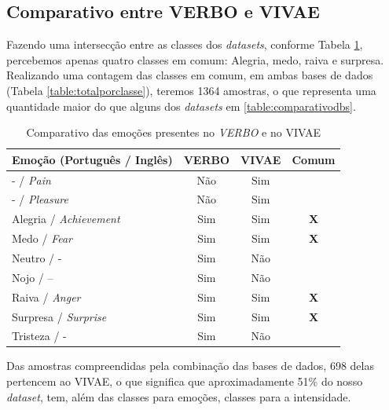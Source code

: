 \subsection{Comparativo entre VERBO e VIVAE}

Fazendo uma intersecção entre as classes dos \textit{datasets}, conforme Tabela \ref{table:verbovsvivae}, percebemos apenas quatro classes em comum: Alegria, medo, raiva e surpresa. Realizando uma contagem das classes em comum, em ambas bases de dados (Tabela \ref{table:totalporclasse}), teremos 1364 amostras, o que representa uma quantidade maior do que alguns dos \textit{datasets} em \ref{table:comparativodbs}.

\begin{table}[]
\centering
\caption{Comparativo das emoções presentes no \textit{VERBO} e no \acrshort{VIVAE}}
    \begin{tabular}{|l|c|c|c|}
    \hline
        Emoção (Português / Inglês) & VERBO & VIVAE & Comum  \\ \hline
        - / \textit{Pain} & Não & Sim &    \\ \hline
        - / \textit{Pleasure} & Não & Sim &    \\ \hline
        Alegria / \textit{Achievement} & Sim & Sim & \textbf{X}  \\ \hline
        Medo / \textit{Fear} & Sim & Sim & \textbf{X}  \\ \hline
        Neutro / - & Sim & Não &    \\ \hline
        Nojo / – & Sim & Não &    \\ \hline
        Raiva / \textit{Anger} & Sim & Sim & \textbf{X}  \\ \hline
        Surpresa / \textit{Surprise} & Sim & Sim & \textbf{X}  \\ \hline
        Tristeza / - & Sim & Não &    \\ \hline
    \end{tabular}\label{table:verbovsvivae}
\end{table}

Das amostras compreendidas pela combinação das bases de dados, 698 delas pertencem ao \acrshort{VIVAE}, o que significa que aproximadamente 51\% do nosso \textit{dataset}, tem, além das classes para emoções, classes para a intensidade.

